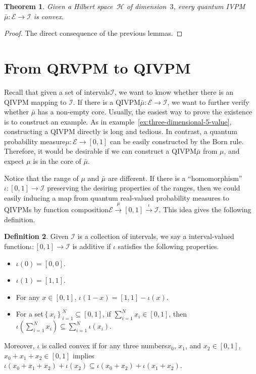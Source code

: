 \documentclass[12pt]{iopart}
\theoremstyle{plain}
\newtheorem{thm}{Theorem}
\theoremstyle{definition}
\newtheorem{definition}[thm]{Definition}
\theoremstyle{remark}
\newcommand{\Hilb}{\mathcal{H}}
\newcommand{\events}{\ensuremath{\mathcal{E}}}
\newcommand{\nb}{\nolinebreak[3] }
\begin{document}
\begin{thm}\label{thm:convex-3}Given a Hilbert space~$\Hilb$ of
dimension~$3$, every quantum IVPM~$\bar{\mu}:\events\rightarrow\mathscr{I}$
is convex.\end{thm}

\begin{proof}The direct consequence of the previous lemmas. \end{proof}

\section{From QRVPM to QIVPM\label{sec:Real-and-Interval}}

Recall that given a set of intervals\nb$\mathscr{I}$, we want to
know whether there is an QIVPM mapping to $\mathscr{I}$. If there
is a QIVPM\nb$\bar{\mu}:\events\rightarrow\mathscr{I}$, we want
to further verify whether $\bar{\mu}$ has a non-empty core. Usually,
the easiest way to prove the existence is to construct an example.
As in example~\ref{ex:three-dimensional-5-value}, constructing a
QIVPM directly is long and tedious. In contrast, a quantum probability
measure\nb$\mu:\events\rightarrow\left[0,1\right]$ can be easily
constructed by the Born rule. Therefore, it would be desirable if
we can construct a QIVPM\nb$\bar{\mu}$ from $\mu$, and expect $\mu$
is in the core of $\bar{\mu}$.

Notice that the range of $\mu$ and $\bar{\mu}$ are different. If
there is a ``homomorphism''\nb$\iota:\left[0,1\right]\rightarrow\mathscr{I}$
preserving the desiring properties of the ranges, then we could easily
inducing a map from quantum real-valued probability measures to QIVPMs
by function composition\nb$\events\overset{\mu}{\rightarrow}\left[0,1\right]\overset{\iota}{\rightarrow}\mathscr{I}$.
This idea gives the following definition.

\begin{definition}Given $\mathscr{I}$ is a collection of intervals,
we say a interval-valued function\nb$\iota:\left[0,1\right]\rightarrow\mathscr{I}$
is additive if $\iota$ satisfies the following properties. 
\begin{itemize}
\item $\iota\left(0\right)=\left[0,0\right]$. 
\item $\iota\left(1\right)=\left[1,1\right]$. 
\item For any $x\in\left[0,1\right]$, $\iota\left(1-x\right)=\left[1,1\right]-\iota\left(x\right)$. 
\item For a set\nb$\left\{ x_{i}\right\} _{i=1}^{N}\subseteq\left[0,1\right]$,
if $\sum_{i=1}^{N}x_{i}\in\left[0,1\right]$, then $\iota\left(\sum_{i=1}^{N}x_{i}\right)\subseteq\sum_{i=1}^{N}\iota\left(x_{i}\right)$. 
\end{itemize}
Moreover, $\iota$ is called convex if for any three numbers\nb$x_{0}$,
$x_{1}$, and $x_{2}\in\left[0,1\right]$, $x_{0}+x_{1}+x_{2}\in\left[0,1\right]$
implies $\iota\left(x_{0}+x_{1}+x_{2}\right)+\iota\left(x_{2}\right)\subseteq\iota\left(x_{0}+x_{2}\right)+\iota\left(x_{1}+x_{2}\right)$.\end{definition}
\end{document}
